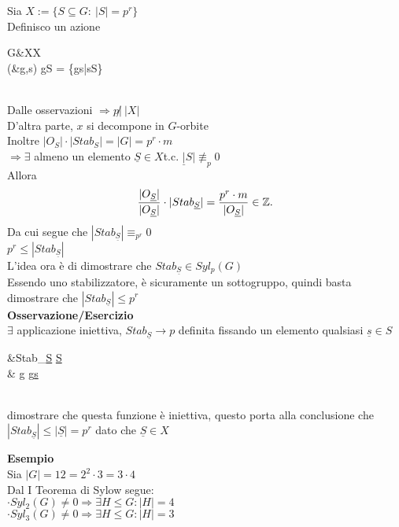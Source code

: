 \documentclass[12px]{article}
\begin{document}
	 \begin{dimo}
		 Sia $X:= \{S\subseteq G:\ |S| = p^r\}$\\
		 Definisco un azione\\
		  \begin{aligned}
			  G&\times X\rightarrow X\\
			  (&g,s) \rightarrow gS = \{gs|s\in S\}
		 \end{aligned}\\
		 Dalle osservazioni $ \Rightarrow p \not | \ |X|$ \\
		 D'altra parte, $x$ si decompone in $G$-orbite\\
		 Inoltre $|O_S|\cdot|Stab_S| = |G| = p^r\cdot m$\\
		  $ \Rightarrow \exists$ almeno un elemento $\underline S\in X$t.c.  $\underline |S|\not\equiv_p 0$\\
		  Allora  
		   \[
			   \frac{|O_{\underline S}|}{|O_{\underline S}|}\cdot |Stab_{\underline S}| = \frac{p^r\cdot m}{|O_{\underline S}|}\in \mathbb{Z}
		  .\] 
		  Da cui segue che $|Stab_{\underline S}|\equiv_{p^r} 0$ \\
		  $p^r\leq |Stab_{\underline S}|$\\
	  L'idea ora è di dimostrare che $Stab_{\underline S}\in Syl_p(G)$\\
	  Essendo uno stabilizzatore, è sicuramente un sottogruppo, quindi basta dimostrare che $|Stab_{\underline S}|\leq p^r$\\
	  \textbf{Osservazione/Esercizio}\\
	  $\exists$ applicazione iniettiva, $Stab_{\underline S} \rightarrow p$ definita fissando un elemento qualsiasi $\underline s\in S$ \\
	   \begin{aligned}
		   &Stab_{\underline S} \rightarrow \underline S\\
		   & g \rightarrow g\underline s
	  \end{aligned}\\
	  dimostrare che questa funzione è iniettiva, questo porta alla conclusione che $|Stab_{\underline S}|\leq |\underline S| = p^r$ dato che  $\underline S\in X$
	 \end{dimo}
	 \textbf{Esempio}\\
	 Sia $|G| = 12  = 2^2\cdot 3 = 3 \cdot 4$\\
	 Dal  I Teorema di Sylow segue:\\
	  $\cdot Syl_2(G)\neq 0 \Rightarrow \exists H\leq G : |H| = 4$ \\
	  $\cdot Syl_3(G)\neq 0 \Rightarrow \exists H\leq G : |H| = 3$ \\
\end{document}
